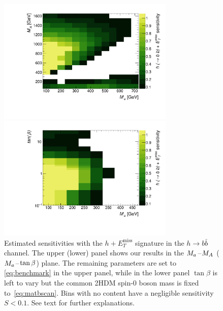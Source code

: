 \documentclass[a4paper, 11pt,notoc]{article}
\newcommand{\MET}{\ensuremath{E_T^\mathrm{miss}}\xspace}
\newcommand{\mA}{\ensuremath{M_{A}}\xspace}
\newcommand{\ma}{\ensuremath{M_{a}}\xspace}
\begin{document}
\begin{figure}[t!]
\centering
\includegraphics[width=0.75\textwidth]{monoHbb_sensi_sum_bins_1_2_3_4_ma_vs_mA_lin.pdf}

\vspace{2mm}

\includegraphics[width=0.75\textwidth]{monoHbb_sensi_sum_bins_1_2_3_4_ma_vs_tanb_lin.pdf}
\vspace{2mm}
\caption{Estimated sensitivities with the $h+\MET$ signature in the $h \to b \bar b$ channel. The upper (lower) panel shows our results in the $\ma\hspace{0.25mm}$--$\hspace{0.25mm}\mA$ ($\ma\hspace{0.25mm}$--$\hspace{0.25mm}\tan \beta$) plane.  The remaining parameters are set to \eqref{eq:benchmark} in the upper panel, while in the lower panel $\tan \beta$ is left to vary but the common 2HDM  {\color{red} spin-0 boson}  mass is fixed to~\eqref{eq:matbscan}. Bins with no content have a negligible sensitivity $S<0.1$. See text for further explanations. }
\label{fig:monoHbb_sensi}
\end{figure}
\end{document}
